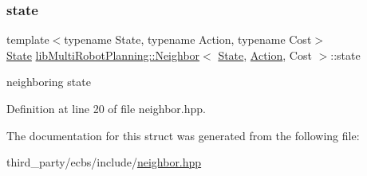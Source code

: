 \subsubsection{\texorpdfstring{state}{state}}
{\footnotesize\ttfamily template$<$typename State, typename Action, typename Cost$>$ \\
\hyperlink{structlib_multi_robot_planning_1_1_state}{State} \hyperlink{structlib_multi_robot_planning_1_1_neighbor}{lib\+Multi\+Robot\+Planning\+::\+Neighbor}$<$ \hyperlink{structlib_multi_robot_planning_1_1_state}{State}, \hyperlink{namespacelib_multi_robot_planning_aba73fb71693f86a324adfa0e41e1053d}{Action}, Cost $>$\+::state}



neighboring state 



Definition at line 20 of file neighbor.\+hpp.



The documentation for this struct was generated from the following file\+:\begin{DoxyCompactItemize}
\item 
third\+\_\+party/ecbs/include/\hyperlink{neighbor_8hpp}{neighbor.\+hpp}\end{DoxyCompactItemize}
